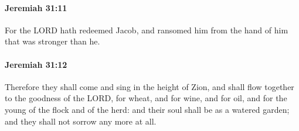 		\paragraph{Jeremiah 31:11} %
			\label{JEREMIAH-31-11}

			For the LORD hath redeemed Jacob, and ransomed him from the hand of him that was stronger than he.


		\paragraph{Jeremiah 31:12} %
			\label{JEREMIAH-31-12}

			Therefore they shall come and sing in the height of Zion, and shall flow together to the goodness of the LORD, for wheat, and for wine, and for oil, and for the young of the flock and of the herd: and their soul shall be as a watered garden; and they shall not sorrow any more at all.

